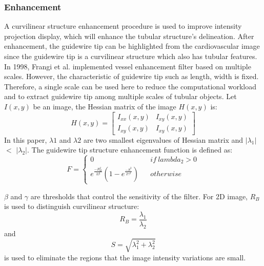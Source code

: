 \documentclass[letterpaper, 10 pt, conference]{ieeeconf}  %
\begin{document}
\subsubsection{Enhancement} 
A curvilinear structure enhancement procedure is used to improve intensity projection display, which will enhance the tubular structure's delineation. After enhancement, the guidewire tip can be highlighted from the cardiovascular image since the guidewire tip is a curvilinear structure which also has tubular features.
In 1998, Frangi et al. \cite{c9} implemented vessel enhancement filter based on multiple scales. However, the characteristic of guidewire tip such as length, width is fixed. Therefore, a single scale can be used here to reduce the computational workload and to extract guidewire tip among multiple scales of tubular objects.
Let $I(x,y)$ be an image, the Hessian matrix of the image $H(x,y)$ is:
\begin{equation}
H(x,y)= 
\left[\begin{array}{ccc}
I_{xx}(x,y) & I_{xy}(x,y)\\
I_{xy}(x,y) & I_{xy}(x,y)
\end{array}
\right]
\end{equation}
In this paper, $\lambda1$ and $\lambda2$ are two smallest eigenvalues of Hessian matrix and $|\lambda_1|$ $<$ $|\lambda_2|$. The guidewire tip structure enhancement function is defined as:
\begin{equation}
F=\left\{
\begin{array}{ccc}
0 & &  {if \  lambda_2 > 0}\\
e^{\frac{-R^{2}_B}{2 \beta}}(1-e^{\frac{-S^{2}}{2\gamma^{2}}}) & & {otherwise}
\end{array} \right.
\end{equation}

$\beta$ and $\gamma$ are thresholds that control the sensitivity of the filter. For 2D image, $R_B$ is used to distinguish curvilinear structure:
\begin{equation}{
R_B = \frac{\lambda_1}{\lambda_2}}
\end{equation}
and 
\begin{equation}{ 
S = \sqrt{\lambda_1^{2}+ \lambda_2^{2}}}
\end{equation}
is used to eliminate the regions that the image intensity variations are small.
\end{document}
